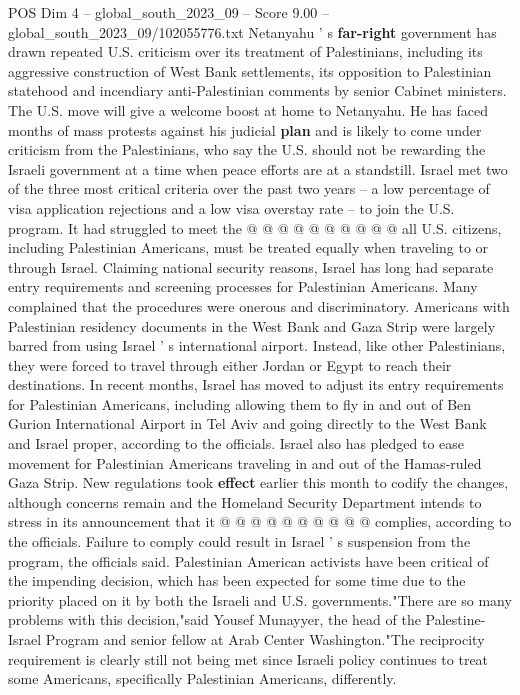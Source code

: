 \begin{textsample}{POS Dim 4 – global\_south\_2023\_09 – Score 9.00 – global\_south\_2023\_09/102055776.txt}
Netanyahu ' s \textbf{far-right} government has drawn repeated U.S. criticism over its treatment of Palestinians, including its aggressive construction of West Bank settlements, its opposition to Palestinian statehood and incendiary anti-Palestinian comments by senior Cabinet ministers.
The U.S. move will give a welcome boost at home to Netanyahu.
He has faced months of mass protests against his judicial \textbf{plan} and is likely to come under criticism from the Palestinians, who say the U.S. should not be rewarding the Israeli government at a time when peace efforts are at a standstill.
Israel met two of the three most critical criteria over the past two years -- a low percentage of visa application rejections and a low visa overstay rate -- to join the U.S. program.
It had struggled to meet the @ @ @ @ @ @ @ @ @ @ all U.S. citizens, including Palestinian Americans, must be treated equally when traveling to or through Israel.
Claiming national security reasons, Israel has long had separate entry requirements and screening processes for Palestinian Americans.
Many complained that the procedures were onerous and discriminatory.
Americans with Palestinian residency documents in the West Bank and Gaza Strip were largely barred from using Israel ' s international airport.
Instead, like other Palestinians, they were forced to travel through either Jordan or Egypt to reach their destinations.
In recent months, Israel has moved to adjust its entry requirements for Palestinian Americans, including allowing them to fly in and out of Ben Gurion International Airport in Tel Aviv and going directly to the West Bank and Israel proper, according to the officials.
Israel also has pledged to ease movement for Palestinian Americans traveling in and out of the Hamas-ruled Gaza Strip.
New regulations took \textbf{effect} earlier this month to codify the changes, although concerns remain and the Homeland Security Department intends to stress in its announcement that it @ @ @ @ @ @ @ @ @ @ complies, according to the officials.
Failure to comply could result in Israel ' s suspension from the program, the officials said.
Palestinian American activists have been critical of the impending decision, which has been expected for some time due to the priority placed on it by both the Israeli and U.S. governments."There are so many problems with this decision,"said Yousef Munayyer, the head of the Palestine-Israel Program and senior fellow at Arab Center Washington."The reciprocity requirement is clearly still not being met since Israeli policy continues to treat some Americans, specifically Palestinian Americans, differently.

\end{textsample}
